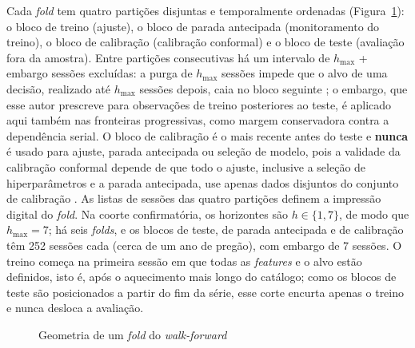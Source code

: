 Cada \textit{fold} tem quatro partições disjuntas e temporalmente ordenadas (Figura~\ref{fig:walkforward}): o bloco de treino (ajuste), o bloco de parada antecipada (monitoramento do treino), o bloco de calibração (calibração conformal) e o bloco de teste (avaliação fora da amostra). Entre partições consecutivas há um intervalo de \(h_{\max}\) + embargo sessões excluídas: a purga de \(h_{\max}\) sessões impede que o alvo de uma decisão, realizado até \(h_{\max}\) sessões depois, caia no bloco seguinte \cite{LOPEZDEPRADO2018JPM}; o embargo, que esse autor prescreve para observações de treino posteriores ao teste, é aplicado aqui também nas fronteiras progressivas, como margem conservadora contra a dependência serial. O bloco de calibração é o mais recente antes do teste e \textbf{nunca} é usado para ajuste, parada antecipada ou seleção de modelo, pois a validade da calibração conformal depende de que todo o ajuste, inclusive a seleção de hiperparâmetros e a parada antecipada, use apenas dados disjuntos do conjunto de calibração \cite{ROMANO2019CQR}. As listas de sessões das quatro partições definem a impressão digital do \textit{fold}. Na coorte confirmatória, os horizontes são \(h \in \{1, 7\}\), de modo que \(h_{\max} = 7\); há seis \textit{folds}, e os blocos de teste, de parada antecipada e de calibração têm 252 sessões cada (cerca de um ano de pregão), com embargo de 7 sessões. O treino começa na primeira sessão em que todas as \textit{features} e o alvo estão definidos, isto é, após o aquecimento mais longo do catálogo; como os blocos de teste são posicionados a partir do fim da série, esse corte encurta apenas o treino e nunca desloca a avaliação.

\begin{figure}[htb]
\centering
\caption{Geometria de um \textit{fold} do \textit{walk-forward}}
\label{fig:walkforward}
\end{figure}


